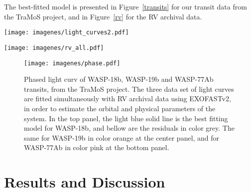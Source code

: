 The best-fitted model is presented in Figure~\ref{transits} for our transit data from the TraMoS project, and in Figure~\ref{rv} for the RV archival data.

\begin{figure*}
\centering
\texttt{[image: imagenes/light\_curves2.pdf]}
\caption{Light curves of WASP-18, WASP19 and WASP77 during 8, 9 and 9 different transits, respectively, from the TraMoS project. The fitted best model from EXOFASTv2 is shown as a light blue solid line for WASP-18b, orange for WASP-19b and pink for WASP-77Ab. To the right of each panel are the corresponding residuals of the model. For clarity, both light curves and their residual are offset artificially. The epoch number is indicated above each light curve. The technical information about each observation is listed in Table~\ref{log_table}.}
\label{transits}
\end{figure*}

\begin{figure*}
\texttt{[image: imagenes/rv\_all.pdf]}
\caption{Radial velocity observations of WASP-18, WASP-19 and WASP-77A from \cite{Hellier2009}, \cite{Hebb2010} and \cite{Maxted2013}, respectively. The best fitted model from the joint modeling of RV and light curves with EXOFASTv2 is in solid line color: light blue for WASP-18b, orange for WASP-19b and pink for WASP-77Ab. The residuals of the model are shown at the bottom panel of each figure.}
\label{rv}
\end{figure*}

\begin{figure}
\centering
\texttt{[image: imagenes/phase.pdf]}
\caption{Phased light curv of WASP-18b, WASP-19b and WASP-77Ab transits, from the TraMoS project. The three data set of light curves are fitted simultaneously with RV archival data using EXOFASTv2, in order to estimate the orbital and physical parameters of the system. In the top panel, the light blue solid line is the best fitting model for WASP-18b, and bellow are the residuals in color grey. The same for WASP-19b in color orange at the center panel, and for WASP-77Ab in color pink at the bottom panel.}
\label{phase}
\end{figure}

\section{Results and Discussion}

